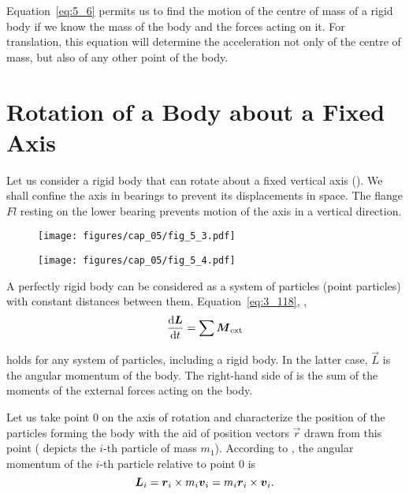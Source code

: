 Equation~\eqref{eq:5_6} permits us to find the motion of the centre of mass of a rigid body if we know the mass of the body and the forces acting on it. For translation, this equation will determine the acceleration not only of the centre of mass, but also of any other point of the body.

\section{Rotation of a Body about a Fixed Axis}\label{sec:5_3}

Let us consider a rigid body that can rotate about a fixed vertical axis (). We shall confine the axis in bearings to prevent its displacements in space. The flange $Fl$ resting on the lower bearing prevents motion of the axis in a vertical direction.

\begin{figure}[t]
	\begin{minipage}[t]{0.5\linewidth}
		\begin{center}
			\texttt{[image: figures/cap\_05/fig\_5\_3.pdf]}
			\caption[]{}
			\label{fig:5_3}
		\end{center}
	\end{minipage}
	\hspace{-0.05cm}
	\begin{minipage}[t]{0.5\linewidth}
		\begin{center}
			\texttt{[image: figures/cap\_05/fig\_5\_4.pdf]}
			\caption[]{}
			\label{fig:5_4}
		\end{center}
	\end{minipage}
\vspace{-0.5cm}
\end{figure}

A perfectly rigid body can be considered as a system of particles (point particles) with constant distances between them. Equation~\eqref{eq:3_118}, \ie,
\begin{equation*}
\frac{\mathrm{d}\boldsymbol{L}}{\mathrm{d} t} = \sum \boldsymbol{M}_{\text{ext}}
\end{equation*}

\noindent
holds for any system of particles, including a rigid body. In the latter case, $\vec{L}$ is the angular momentum of the body. The right-hand side of  is the sum of the moments of the external forces acting on the body.

Let us take point $0$ on the axis of rotation and characterize the position of the particles forming the body with the aid of position vectors $\vec{r}$ drawn from this point ( depicts the $i$-th particle of mass $m_1$). According to , the angular momentum of the $i$-th particle relative to point $0$ is
\begin{equation}\label{eq:5_7}
\boldsymbol{L}_i = \boldsymbol{r}_i \times m_i\boldsymbol{v}_i = m_i\boldsymbol{r}_{i}\times\boldsymbol{v}_{i}.
\end{equation}

